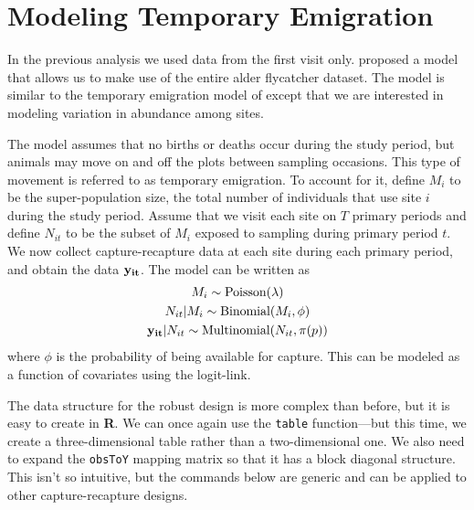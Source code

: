 \documentclass[a4paper]{article}
\renewenvironment{Schunk}{\vspace{\topsep}}{\vspace{\topsep}}
\begin{document}
\section{Modeling Temporary Emigration}

In the previous analysis we used data from the first visit only.
\citet{chandlerEA_2011} proposed a model that allows us to
make use of the entire alder flycatcher dataset. The model is similar
to the temporary emigration model of \citet{kendall_etal:1997} except
that we are
interested in modeling variation in abundance among sites.

The model assumes that no births or deaths occur during the study
period, but animals may move on and off the plots between sampling
occasions. This type of movement is referred to as temporary
emigration. To account for it, define $M_i$ to be the super-population
size, the total number of individuals that use site $i$ during the
study period. Assume that we visit each site on $T$
primary periods and define $N_{it}$ to be the subset of $M_i$ exposed
to sampling during primary period $t$. We now collect
capture-recapture data
at each site during each primary period, and obtain the data $\bf
y_{it}$. The model can be written as
\begin{gather}
  M_i \sim \mbox{Poisson}(\lambda) \nonumber \\
  N_{it}|M_i \sim \mbox{Binomial}(M_i, \phi) \nonumber \\
  {\bf y_{it}}|N_{it} \sim \mbox{Multinomial}(N_{it}, \pi(p))
  \label{mod:te}
\end{gather}
where $\phi$ is the probability of being available for capture. This
can be modeled as a function of covariates using the logit-link.

The data structure for the robust design is more complex than before,
but it is easy to create in \textbf{R}. We can once again use the
\texttt{table} function---but this time, we create a three-dimensional table
rather than a two-dimensional one. We also need to expand the
\texttt{obsToY} mapping matrix so that it has a block diagonal
structure. This isn't so intuitive, but the
commands below are generic and can be applied to other
capture-recapture designs.

\begin{Schunk}
\end{Schunk}
\end{document}
